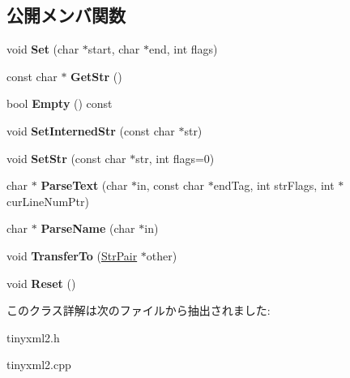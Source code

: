 \subsection*{公開メンバ関数}
\begin{DoxyCompactItemize}
\item 
\mbox{\label{classtinyxml2_1_1_str_pair_a4f05549373394266a1eecba26813c166}} 
void {\bfseries Set} (char $\ast$start, char $\ast$end, int flags)
\item 
\mbox{\label{classtinyxml2_1_1_str_pair_ad87e3d11330f5e689ba1e7e54c023b57}} 
const char $\ast$ {\bfseries Get\+Str} ()
\item 
\mbox{\label{classtinyxml2_1_1_str_pair_aca963a7eaa900bfddbea7312f040b39c}} 
bool {\bfseries Empty} () const
\item 
\mbox{\label{classtinyxml2_1_1_str_pair_a2baf6230e18333e02ab65d0897ee3941}} 
void {\bfseries Set\+Interned\+Str} (const char $\ast$str)
\item 
\mbox{\label{classtinyxml2_1_1_str_pair_a1f82ec6b5bee35ee7466d8565e43b1de}} 
void {\bfseries Set\+Str} (const char $\ast$str, int flags=0)
\item 
\mbox{\label{classtinyxml2_1_1_str_pair_a68e6999b7677fa711287ececb9ba317e}} 
char $\ast$ {\bfseries Parse\+Text} (char $\ast$in, const char $\ast$end\+Tag, int str\+Flags, int $\ast$cur\+Line\+Num\+Ptr)
\item 
\mbox{\label{classtinyxml2_1_1_str_pair_aa6d8998efceba41d87ec2300c70a6085}} 
char $\ast$ {\bfseries Parse\+Name} (char $\ast$in)
\item 
\mbox{\label{classtinyxml2_1_1_str_pair_a35f795b1557fe5fdcbd93d3cc5d6b939}} 
void {\bfseries Transfer\+To} (\hyperlink{classtinyxml2_1_1_str_pair}{Str\+Pair} $\ast$other)
\item 
\mbox{\label{classtinyxml2_1_1_str_pair_a80c1b3bd99bf62ae85c94a29ce537125}} 
void {\bfseries Reset} ()
\end{DoxyCompactItemize}


このクラス詳解は次のファイルから抽出されました\+:\begin{DoxyCompactItemize}
\item 
tinyxml2.\+h\item 
tinyxml2.\+cpp\end{DoxyCompactItemize}
